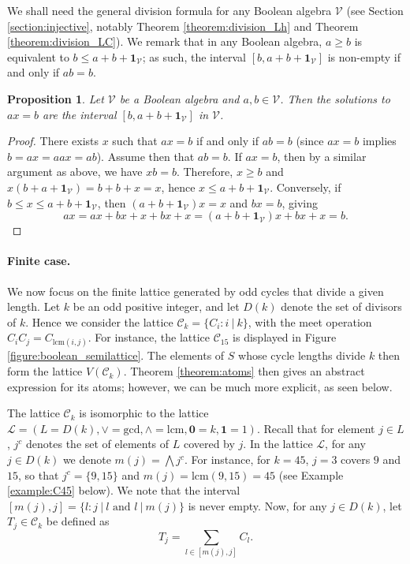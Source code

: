 \documentclass[a4paper, 11pt]{article}
\theoremstyle{plain}
\newtheorem{proposition}[theorem]{Proposition}
\theoremstyle{definition}
\newcommand{\join}      {\lor}
\newcommand{\meet}      {\land}
\newcommand{\bigmeet}   {\bigwedge}
\newcommand{\zero}      {\mathbf{0}}
\newcommand{\one}       {\mathbf{1}}
\newcommand{\lcm}       {\mathrm{lcm}}
\begin{document}
We shall need the general division formula for any Boolean algebra $\mathcal{V}$ (see Section \ref{section:injective}, notably Theorem \ref{theorem:division_Lh} and Theorem \ref{theorem:division_LC}). We remark that in any Boolean algebra, $a \ge b$ is equivalent to $b \le a + b + \one_\mathcal{V}$; as such, the interval $[b, a + b + \one_\mathcal{V} ]$ is non-empty if and only if $ab = b$.

\begin{proposition} \label{proposition:ax=b_S0}
Let $\mathcal{V}$ be a Boolean algebra and $a,b \in \mathcal{V}$. Then the solutions to $a x = b$ are the interval $[ b, a + b + \one_\mathcal{V} ]$ in $\mathcal{V}$.
\end{proposition}

\begin{proof}
There exists $x$ such that $ax = b$ if and only if $ab = b$ (since $ax = b$ implies $b = ax = aax = ab$). Assume then that $ab = b$. If $ax = b$, then by a similar argument as above, we have $xb = b$. Therefore, $x \ge b$ and $x ( b + a + \one_\mathcal{V} ) = b + b  +x= x$, hence $x \le a + b + \one_\mathcal{V}$. Conversely, if $b \le x \le a + b + \one_\mathcal{V}$, then $( a + b + \one_\mathcal{V} ) x = x$ and $bx = b$, giving
\[
    ax = ax + bx + x + bx + x = ( a + b + \one_\mathcal{V} )x + bx + x = b.
\]
\end{proof}


\paragraph{Finite case.}

We now focus on the finite lattice generated by odd cycles that divide a given length. Let $k$ be an odd positive integer, and let $D(k)$ denote the set of divisors of $k$. Hence we consider the lattice $\mathcal{C}_k = \{ C_i : i \ | \ k  \}$, with the meet operation $C_i C_j = C_{\lcm(i,j)}$. For instance, the lattice $\mathcal{C}_{15}$ is displayed in Figure \ref{figure:boolean_semilattice}. The elements of $S$ whose cycle lengths divide $k$ then form the lattice $V( \mathcal{C}_k )$. Theorem \ref{theorem:atoms} then gives an abstract expression for its atoms; however, we can be much more explicit, as seen below.

The lattice $\mathcal{C}_k$ is isomorphic to the lattice $\mathcal{L} = ( L = D(k), \join = \mathrm{gcd}, \meet = \lcm, \zero = k, \one = 1 )$. Recall that for element $j \in L$, $j^c$ denotes the set of elements of $L$ covered by $j$. In the lattice $\mathcal{L}$, for any $j \in D(k)$ we denote $m(j) = \bigmeet j^c$. For instance, for $k = 45$, $j = 3$ covers $9$ and $15$, so that $j^c = \{9, 15\}$ and $m(j) = \lcm(9, 15) = 45$ (see Example \ref{example:C45} below). We note that the interval $[m(j), j] = \{ l : j \ | \ l \text{ and } l \ | \ m(j) \}$ is never empty. Now, for any $j \in D(k)$, let $T_j \in \mathcal{C}_k$ be defined as 
\[
    T_j = \sum_{ l \in [m(j), j] } C_l.
\]
\end{document}
